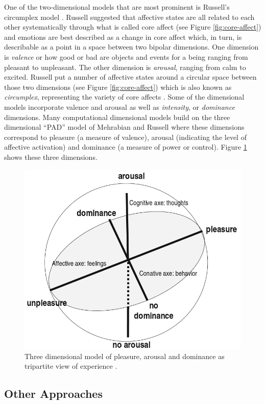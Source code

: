 \documentclass[11pt]{article}
\begin{document}
One of the two-dimensional models that are most prominent is Russell's
circumplex model \cite{russell:circumplex-affect}. Russell suggested that
affective states are all related to each other systematically through what is
called core affect \cite{russell:circumplex-affect,russell:core-affect} (see
Figure \ref{fig:core-affect}) and emotions are best described as a change in
core affect which, in turn, is describable as a point in a space between two
bipolar dimensions. One dimension is \textit{valence} or how good or bad are
objects and events for a being ranging from pleasant to unpleasant. The other
dimension is \textit{arousal}, ranging from calm to excited. Russell put a
number of affective states around a circular space between those two dimensions
(see Figure \ref{fig:core-affect}) which is also known as \textit{circumplex},
representing the variety of core affects
\cite{russell:circumplex-affect,russell:core-affect}. Some of the dimensional
models incorporate valence and arousal as well as \textit{intensity}, or
\textit{dominance} dimensions. Many computational dimensional models build on
the three dimensional “PAD” model of Mehrabian and Russell
\cite{mehrabian-russell:pad} where these dimensions correspond to pleasure (a
measure of valence), arousal (indicating the level of affective activation) and
dominance (a measure of power or control). Figure \ref{fig:pad} shows these
three dimensions.

\begin{figure}[tbh]
  \center
  \includegraphics[width=.6\textwidth]{figure/dimensional2.png}
  \caption{Three dimensional model of pleasure, arousal and dominance as
  tripartite view of experience \cite{mehrabian:pad}.}
  \label{fig:pad}
\end{figure}

\subsection{Other Approaches}
\end{document}
